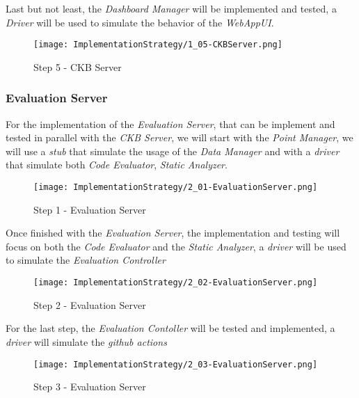 Last but not least, the \textit{Dashboard Manager} will be implemented and tested, a \textit{Driver} will be used to simulate the behavior of the \textit{WebAppUI}.
\begin{figure}[H]
    \label{fig:step5-CKBServer}
    \centering
    \texttt{[image: ImplementationStrategy/1\_05-CKBServer.png]}
    \caption{Step 5 - CKB Server}
\end{figure}
\pagebreak

\subsubsection{Evaluation Server}
For the implementation of the \textit{Evaluation Server}, that can be implement and tested in parallel with the \textit{CKB Server}, we will start with the \textit{Point Manager}, we will use a \textit{stub} that simulate the usage of the \textit{Data Manager} and with a \textit{driver} that simulate both \textit{Code Evaluator}, \textit{Static Analyzer}.
\begin{figure}[H]
    \label{fig:step1-EvaluationServer}
    \centering
    \texttt{[image: ImplementationStrategy/2\_01-EvaluationServer.png]}
    \caption{Step 1 - Evaluation Server}
\end{figure}
\pagebreak
Once finished with the \textit{Evaluation Server}, the implementation and testing will focus on both the \textit{Code Evaluator} and the \textit{Static Analyzer}, a \textit{driver} will be used to simulate the \textit{Evaluation Controller}
\begin{figure}[H]
    \label{fig:step2-EvaluationServer}
    \centering
    \texttt{[image: ImplementationStrategy/2\_02-EvaluationServer.png]}
    \caption{Step 2 - Evaluation Server}
\end{figure}
\pagebreak
For the last step, the \textit{Evaluation Contoller} will be tested and implemented, a \textit{driver} will simulate the \textit{github actions}
\begin{figure}[H]
    \label{fig:step3-EvaluationServer}
    \centering
    \texttt{[image: ImplementationStrategy/2\_03-EvaluationServer.png]}
    \caption{Step 3 - Evaluation Server}
\end{figure}
